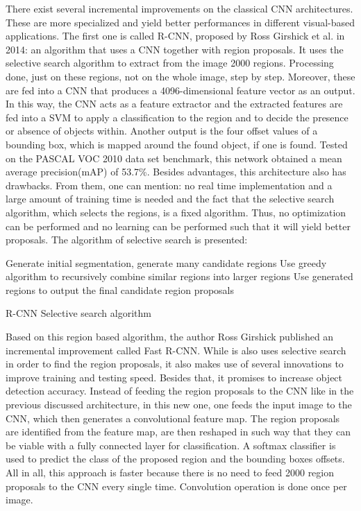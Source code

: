 \documentclass[12pt,a4paper,twoside]{report}
\begin{document}
There exist several incremental improvements on the classical CNN architectures. These are more specialized and yield better performances in different visual-based applications. The first one is called R-CNN, proposed by Ross Girshick et al. in 2014\cite{article-rcnn}: an algorithm that uses a CNN together with region proposals. It uses the selective search algorithm to extract from the image 2000 regions. Processing done, just on these regions, not on the whole image, step by step. Moreover, these are fed into a CNN that produces a 4096-dimensional feature vector as an output. In this way, the CNN acts as a feature extractor and the extracted features are fed into a SVM to apply a classification to the region and to decide the presence or absence of objects within. Another output is the four offset values of a bounding box, which is mapped around the found object, if one is found. Tested on the PASCAL VOC 2010 data set benchmark, this network obtained a mean average precision(mAP) of 53.7\%. Besides advantages, this architecture also has drawbacks. From them, one can mention: no real time implementation and a large amount of training time is needed and the fact that the selective search algorithm, which selects the regions, is a fixed algorithm. Thus, no optimization can be performed and no learning can be performed such that it will yield better proposals. The algorithm of selective search is presented:\par
\begin{algorithm}[H]
\SetAlgoLined
{}
 Generate initial segmentation, generate many candidate     regions\;
 Use greedy algorithm to recursively combine similar regions into larger regions \;
 Use generated regions to output the final candidate region proposals \;
 \caption{R-CNN Selective search algorithm}
\end{algorithm}
\par
Based on this region based algorithm, the author Ross Girshick published an incremental improvement called Fast R-CNN\cite{article-fastrcnn}. While is also uses selective search in order to find the region proposals, it also makes use of several innovations to improve training and testing speed. Besides that, it promises to increase object detection accuracy. Instead of feeding the region proposals to the CNN like in the previous discussed architecture, in this new one, one feeds the input image to the CNN, which then generates a convolutional feature map. The region proposals are identified from the feature map, are then reshaped in such way that they can be viable with a fully connected layer for classification. A softmax classifier is used to predict the class of the proposed region and the bounding boxes offsets. All in all, this approach is faster because there is no need to feed 2000 region proposals to the CNN every single time. Convolution operation is done once per image.\par
\end{document}
